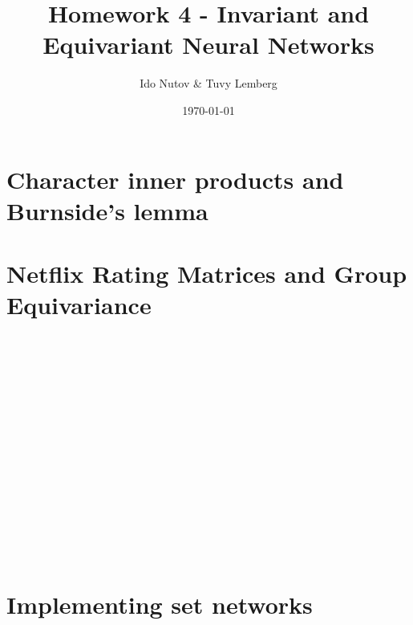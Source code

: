 \documentclass[11pt]{article}
\title{Homework 4 - Invariant and Equivariant Neural
Networks}
\author{Ido Nutov \& Tuvy Lemberg}
\date{\today}
\begin{document}
\maketitle

\section{Character inner products and Burnside's lemma}

\section{Netflix Rating Matrices and Group Equivariance}

\subsection{~}
\subsection{~}
\subsection{~}
\subsection{~}
\subsection{~}


\section{Implementing set networks}

\subsection{~}
\subsection{~}
\subsection{~}
\subsection{~}
\subsection{~}
\end{document}
